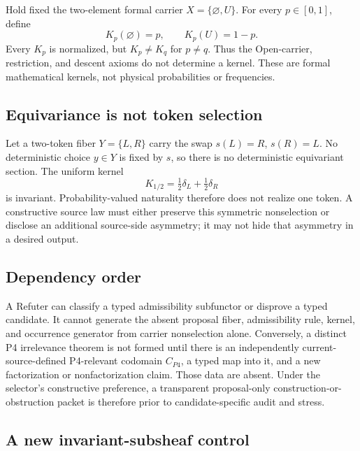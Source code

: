 \documentclass[11pt]{article}
\begin{document}
Hold fixed the two-element formal carrier
\(X=\{\varnothing,U\}\). For every \(p\in[0,1]\), define
\begin{equation}
  K_p(\varnothing)=p,\qquad K_p(U)=1-p.
  \label{eq:kernel-simplex}
\end{equation}
Every \(K_p\) is normalized, but \(K_p\neq K_q\) for \(p\neq q\). Thus the
Open-carrier, restriction, and descent axioms do not determine a kernel. These
are formal mathematical kernels, not physical probabilities or frequencies.

\subsection{Equivariance is not token selection}

Let a two-token fiber \(Y=\{L,R\}\) carry the swap \(s(L)=R\),
\(s(R)=L\). No deterministic choice \(y\in Y\) is fixed by \(s\), so there is
no deterministic equivariant section. The uniform kernel
\begin{equation}
  K_{1/2}=\tfrac12\delta_L+\tfrac12\delta_R
\end{equation}
is invariant. Probability-valued naturality therefore does not realize one
token. A constructive source law must either preserve this symmetric
nonselection or disclose an additional source-side asymmetry; it may not hide
that asymmetry in a desired output.

\subsection{Dependency order}

A Refuter can classify a typed admissibility subfunctor or disprove a typed
candidate. It cannot generate the absent proposal fiber, admissibility rule,
kernel, and occurrence generator from carrier nonselection alone. Conversely,
a distinct P4 irrelevance theorem is not formed until there is an independently
current-source-defined P4-relevant codomain \(C_{P4}\), a typed map into it,
and a new factorization or nonfactorization claim. Those data are absent. Under
the selector's constructive preference, a transparent proposal-only
construction-or-obstruction packet is therefore prior to candidate-specific
audit and stress.

\subsection{A new invariant-subsheaf control}
\end{document}
